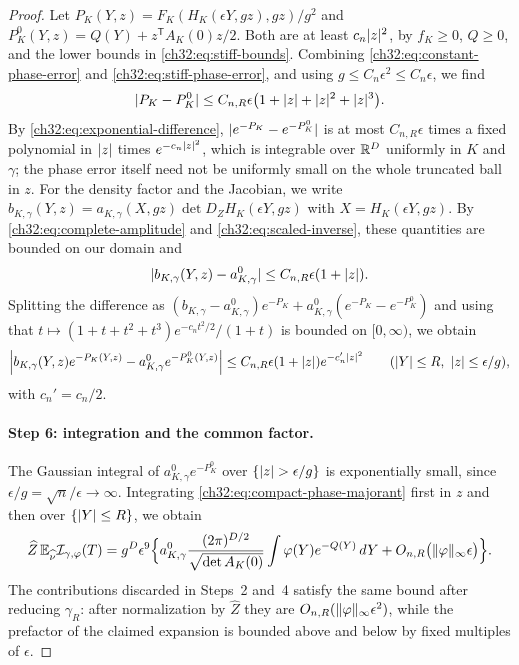 \begin{proof}
Let $P_K(Y,z)=F_K(H_K(\epsilon Y,gz),gz)/g^2$ and $P^0_K(Y,z)=Q(Y)+z^{\mathsf T}A_K(0)z/2$. Both are at least $c_n\lvert z\rvert^2$, by $f_K\ge0$, $Q\ge0$, and the lower bounds in \eqref{ch32:eq:stiff-bounds}. Combining \eqref{ch32:eq:constant-phase-error} and \eqref{ch32:eq:stiff-phase-error}, and using $g\le C_n\epsilon^2\le C_n\epsilon$, we find
\[
 \lvert P_K-P^0_K\rvert\le C_{n,R}\epsilon\bigl(1+\lvert z\rvert+\lvert z\rvert^2+\lvert z\rvert^3\bigr).
\]
By \eqref{ch32:eq:exponential-difference}, $\lvert e^{-P_K}-e^{-P^0_K}\rvert$ is at most $C_{n,R}\epsilon$ times a fixed polynomial in $\lvert z\rvert$ times $e^{-c_n\lvert z\rvert^2}$, which is integrable over $\mathbb R^D$ uniformly in $K$ and $\gamma$; the phase error itself need not be uniformly small on the whole truncated ball in $z$. For the density factor and the Jacobian, we write $b_{K,\gamma}(Y,z)=a_{K,\gamma}(X,gz)\det D_ZH_K(\epsilon Y,gz)$ with $X=H_K(\epsilon Y,gz)$. By \eqref{ch32:eq:complete-amplitude} and \eqref{ch32:eq:scaled-inverse}, these quantities are bounded on our domain and
\[
 \lvert b_{K,\gamma}(Y,z)-a^0_{K,\gamma}\rvert\le C_{n,R}\epsilon(1+\lvert z\rvert).
\]
Splitting the difference as $(b_{K,\gamma}-a^0_{K,\gamma})e^{-P_K}+a^0_{K,\gamma}(e^{-P_K}-e^{-P^0_K})$ and using that $t\mapsto(1+t+t^2+t^3)e^{-c_nt^2/2}/(1+t)$ is bounded on $[0,\infty)$, we obtain
\begin{equation}\label{ch32:eq:compact-phase-majorant}
 \Bigl\lvert b_{K,\gamma}(Y,z)e^{-P_K(Y,z)}-a^0_{K,\gamma}e^{-P^0_K(Y,z)}\Bigr\rvert\le C_{n,R}\epsilon(1+\lvert z\rvert)e^{-c_n'\lvert z\rvert^2}\qquad(\lvert Y\rvert\le R,\ \lvert z\rvert\le\epsilon/g),
\end{equation}
with $c_n'=c_n/2$.

\paragraph{Step 6: integration and the common factor.}
The Gaussian integral of $a^0_{K,\gamma}e^{-P^0_K}$ over $\{\lvert z\rvert>\epsilon/g\}$ is exponentially small, since $\epsilon/g=\sqrt n/\epsilon\to\infty$. Integrating \eqref{ch32:eq:compact-phase-majorant} first in $z$ and then over $\{\lvert Y\rvert\le R\}$, we obtain
\begin{equation}\label{ch32:eq:unnormalized-core}
 \widehat Z\,\mathbb E_{\widehat\nu}\mathcal I_{\gamma,\varphi}(T)=g^D\epsilon^9\Bigl\{a^0_{K,\gamma}\frac{(2\pi)^{D/2}}{\sqrt{\det A_K(0)}}\int\varphi(Y)e^{-Q(Y)}\,dY+O_{n,R}\bigl(\lVert \varphi\rVert_\infty\epsilon\bigr)\Bigr\}.
\end{equation}
The contributions discarded in Steps~2 and~4 satisfy the same bound after reducing $\gamma_R$: after normalization by $\widehat Z$ they are $O_{n,R}(\lVert \varphi\rVert_\infty\epsilon^2)$, while the prefactor of the claimed expansion is bounded above and below by fixed multiples of $\epsilon$.


\end{proof}
